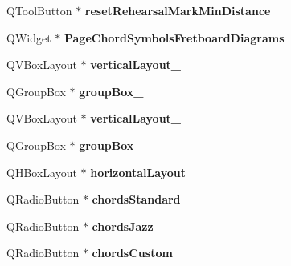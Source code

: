 \begin{DoxyCompactItemize}
\item 
\mbox{\label{class_ui___edit_style_base_a7b2d13f71a82605bda99893e918d27f8}} 
Q\+Tool\+Button $\ast$ {\bfseries reset\+Rehearsal\+Mark\+Min\+Distance}
\item 
\mbox{\label{class_ui___edit_style_base_a99c9f886e6de705c7f1c60ee60f921ee}} 
Q\+Widget $\ast$ {\bfseries Page\+Chord\+Symbols\+Fretboard\+Diagrams}
\item 
\mbox{\label{class_ui___edit_style_base_a883f946b822d6355c5c0e37c0a13536f}} 
Q\+V\+Box\+Layout $\ast$ {\bfseries vertical\+Layout\+\_}
\item 
\mbox{\label{class_ui___edit_style_base_acb2efbece0dee23419c0d6b103800a2c}} 
Q\+Group\+Box $\ast$ {\bfseries group\+Box\+\_}
\item 
\mbox{\label{class_ui___edit_style_base_a574dd6fc048dd6946e4b2da6ffd415dc}} 
Q\+V\+Box\+Layout $\ast$ {\bfseries vertical\+Layout\+\_}
\item 
\mbox{\label{class_ui___edit_style_base_a5f81044b8dab63a44eb07090615ec4d2}} 
Q\+Group\+Box $\ast$ {\bfseries group\+Box\+\_}
\item 
\mbox{\label{class_ui___edit_style_base_a99dbcc9b112c9a4ec1fa354a9600c519}} 
Q\+H\+Box\+Layout $\ast$ {\bfseries horizontal\+Layout}
\item 
\mbox{\label{class_ui___edit_style_base_a3d042d7047e57e57dad9b683c8e5bb97}} 
Q\+Radio\+Button $\ast$ {\bfseries chords\+Standard}
\item 
\mbox{\label{class_ui___edit_style_base_a06add3979d94a235b9aa54319e746d8a}} 
Q\+Radio\+Button $\ast$ {\bfseries chords\+Jazz}
\item 
\mbox{\label{class_ui___edit_style_base_a2b42ae00abf3b9a331382ea332ffb32d}} 
Q\+Radio\+Button $\ast$ {\bfseries chords\+Custom}
\item 

\end{DoxyCompactItemize}
